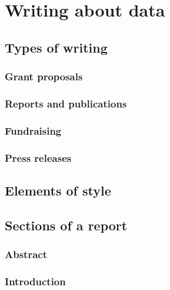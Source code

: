 \documentclass[
]{book}
\begin{document}
\hypertarget{part-writing-about-data}{%
\part{Writing about data}\label{part-writing-about-data}}

\hypertarget{types-of-writing}{%
\chapter{Types of writing}\label{types-of-writing}}

\hypertarget{grant-proposals}{%
\section{Grant proposals}\label{grant-proposals}}

\hypertarget{reports-and-publications}{%
\section{Reports and publications}\label{reports-and-publications}}

\hypertarget{fundraising}{%
\section{Fundraising}\label{fundraising}}

\hypertarget{press-releases}{%
\section{Press releases}\label{press-releases}}

\hypertarget{elements-of-style}{%
\chapter{Elements of style}\label{elements-of-style}}

\hypertarget{sections-of-a-report}{%
\chapter{Sections of a report}\label{sections-of-a-report}}

\hypertarget{abstract}{%
\section{Abstract}\label{abstract}}

\hypertarget{introduction-3}{%
\section{Introduction}\label{introduction-3}}
\end{document}
